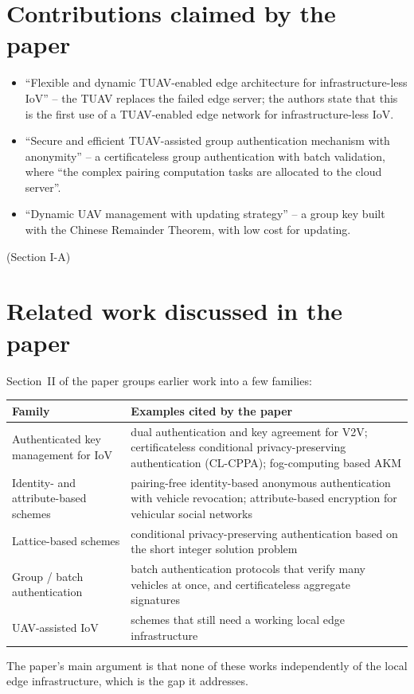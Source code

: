 \section{Contributions claimed by the paper}
\begin{claimbox}
\begin{itemize}[leftmargin=*]
\item ``Flexible and dynamic TUAV-enabled edge architecture for infrastructure-less IoV'' -- the TUAV replaces the failed edge server; the authors state
that this is the first use of a TUAV-enabled edge network for infrastructure-less IoV.
\item ``Secure and efficient TUAV-assisted group authentication mechanism with anonymity'' -- a certificateless group authentication with batch
validation, where ``the complex pairing computation tasks are allocated to the cloud server''.
\item ``Dynamic UAV management with updating strategy'' -- a group key built with the Chinese Remainder Theorem, with low cost for updating.
\end{itemize}
\hfill (Section I-A)
\end{claimbox}

\section{Related work discussed in the paper}
Section~II of the paper groups earlier work into a few families:
\begin{center}
\small
\begin{tabularx}{\linewidth}{@{}p{4.2cm} X@{}}
\toprule
\textbf{Family} & \textbf{Examples cited by the paper}\\
\midrule
Authenticated key management for IoV & dual authentication and key agreement for V2V; certificateless conditional privacy-preserving authentication
(CL-CPPA); fog-computing based AKM\\
Identity- and attribute-based schemes & pairing-free identity-based anonymous authentication with vehicle revocation; attribute-based encryption for
vehicular social networks\\
Lattice-based schemes & conditional privacy-preserving authentication based on the short integer solution problem\\
Group / batch authentication & batch authentication protocols that verify many vehicles at once, and certificateless aggregate signatures\\
UAV-assisted IoV & schemes that still need a working local edge infrastructure\\
\bottomrule
\end{tabularx}
\end{center}
The paper's main argument is that none of these works independently of the local edge infrastructure, which is the gap it addresses.


